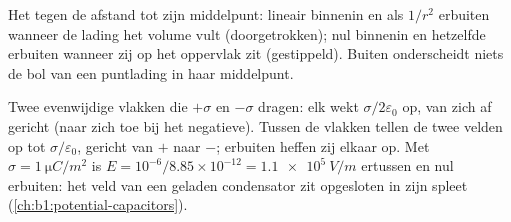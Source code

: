 \begin{omfigure}

{\small Het  tegen de afstand tot zijn middelpunt:
lineair binnenin en als $1/r^2$ erbuiten wanneer de lading het volume vult
(doorgetrokken); nul binnenin en hetzelfde erbuiten wanneer zij op het oppervlak zit
(gestippeld). Buiten onderscheidt niets de bol van een puntlading
in haar middelpunt.}
\end{omfigure}

\begin{example}\label{ex:b1:electrostatics-gauss:twoplanes}
Twee evenwijdige vlakken die $+\sigma$ en $-\sigma$ dragen: elk wekt
$\sigma/2\varepsilon_0$ op, van zich af gericht (naar zich toe bij het negatieve).
Tussen de vlakken tellen de twee velden op tot $\sigma/\varepsilon_0$, gericht van
$+$ naar $-$; erbuiten heffen zij elkaar op. Met $\sigma = \qty{1}{\micro C/m^2}$ is $E =
10^{-6}/8.85 \times 10^{-12} = \qty{1.1e5}{V/m}$ ertussen en nul erbuiten: het
veld van een geladen condensator zit opgesloten in zijn spleet
(\cref{ch:b1:potential-capacitors}).
\end{example}

